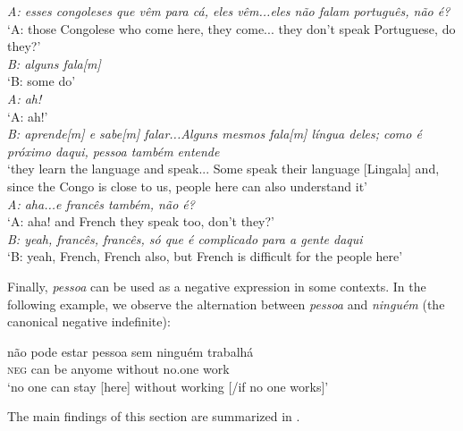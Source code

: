\documentclass[output=paper,colorlinks,citecolor=brown]{langscibook}
\begin{document}
\ea \label{ex:gut60}
    \textit{A: esses congoleses que vêm para cá, eles vêm...eles não falam português, não é?}\\
    ‘A: those Congolese who come here, they come... they don’t speak Portuguese, do they?’\\
    \textit{B: alguns fala[m]}\\
    ‘B: some do’\\
    \textit{A: ah!}\\
    ‘A: ah!’ \\
    \textit{B: aprende[m] e sabe[m] falar...Alguns mesmos fala[m] língua deles; como é próximo daqui, pessoa também entende}\\
    ‘they learn the language and speak... Some speak their language [Lingala] and, since the Congo is close to us, people here can also understand it’\\
    \textit{A: aha...e francês também, não é?}\\
    ‘A: aha! and French they speak too, don’t they?’\\
    \textit{B: yeah, francês, francês, só que é complicado para a gente daqui}\\
    ‘B: yeah, French, French also, but French is difficult for the people here’
\z

Finally, \textit{pessoa} can be used as a negative expression in some contexts. In the following example, we observe the alternation between \textit{pessoa} and \textit{ninguém} (the canonical negative indefinite): 

\ea \label{ex:gut61}
    \gll não pode estar pessoa sem ninguém trabalhá \\
    \textsc{neg} can be anyome without no.one work\\
    \glt ‘no one can stay [here] without working [/if no one works]’
\z

The main findings of this section are summarized in .
\end{document}
